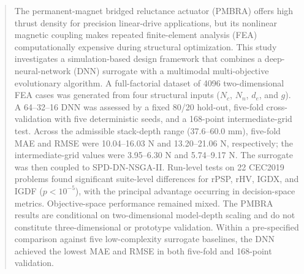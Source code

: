 \maketitle

\begin{abstract}
The permanent-magnet bridged reluctance actuator (PMBRA) offers high thrust density for precision linear-drive applications, but its nonlinear magnetic coupling makes repeated finite-element analysis (FEA) computationally expensive during structural optimization. This study investigates a simulation-based design framework that combines a deep-neural-network (DNN) surrogate with a multimodal multi-objective evolutionary algorithm. A full-factorial dataset of 4096 two-dimensional FEA cases was generated from four structural inputs ($N_c$, $N_n$, $d_e$, and $g$). A 64--32--16 DNN was assessed by a fixed 80/20 hold-out, five-fold cross-validation with five deterministic seeds, and a 168-point intermediate-grid test. Across the admissible stack-depth range (37.6--60.0 mm), five-fold MAE and RMSE were 10.04--16.03 N and 13.20--21.06 N, respectively; the intermediate-grid values were 3.95--6.30 N and 5.74--9.17 N. The surrogate was then coupled to SPD-DN-NSGA-II. Run-level tests on 22 CEC2019 problems found significant suite-level differences for rPSP, rHV, IGDX, and IGDF ($p<10^{-5}$), with the principal advantage occurring in decision-space metrics. Objective-space performance remained mixed. The PMBRA results are conditional on two-dimensional model-depth scaling and do not constitute three-dimensional or prototype validation.
Within a pre-specified comparison against five low-complexity surrogate baselines, the DNN achieved the lowest MAE and RMSE in both five-fold and 168-point validation.
\end{abstract}
